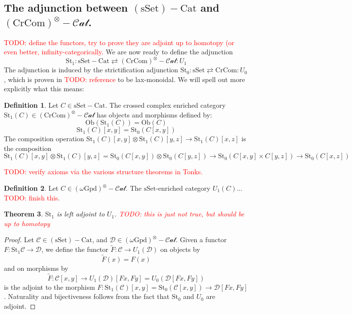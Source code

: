 \documentclass[12pt]{article}
\newtheorem{theorem}{Theorem}[section]
\theoremstyle{definition}
\newtheorem{definition}[theorem]{Definition}
\newcommand{\TODO}[1]{\textcolor{red}{TODO: {#1}}}
\newcommand{\C}{\mathcal{C}}
\newcommand{\D}{\mathcal{D}}
\newcommand{\sset}{\text{sSet}}
\newcommand{\stinfty}{\omega\text{Gpd}}
\newcommand{\crcom}{\text{CrCom}}
\newcommand{\graycatzero}{(\stinfty)^\otimes-\mathcal{Cat}}
\newcommand{\tensorcrossedcat}{(\crcom)^\otimes-\mathcal{Cat}}
\newcommand{\ssetcat}{(\text{sSet})-\text{Cat}}
\begin{document}
	\subsection{The adjunction between $\ssetcat$ and $\tensorcrossedcat$.}
		\TODO{define the functors, try to prove they are adjoint up to homotopy (or even better, infinity-categorically.}
		We are now ready to define the adjunction
		$$
			\text{St}_1: \sset-\text{Cat} \rightleftarrows \tensorcrossedcat: U_1
		$$
		The adjunction is induced by the strictification adjunction $\text{St}_0: \sset \rightleftarrows \crcom :  U_0$, which is proven in \TODO{reference} to be lax-monoidal. We will spell out more explicitly what this means:
		\begin{definition}
			Let $C \in \sset-\text{Cat}$. The crossed complex enriched category $\text{St}_1(C)\in \tensorcrossedcat$ has objects and morphisms defined by:
				$$\text{Ob}(\text{St}_1(C)) = \text{Ob}(C)$$
				$$\text{St}_1(C)[x,y] = \text{St}_0(C[x,y])$$
				The composition operation $\text{St}_1(C)[x,y] \otimes \text{St}_1(C)[y,z] \to \text{St}_1(C)[x,z]$ is the composition
				$$
					\text{St}_1(C)[x,y] \otimes \text{St}_1(C)[y,z] = \text{St}_0(C[x,y]) \otimes \text{St}_0(C[y,z]) \to \text{St}_0(C[x,y] \times C[y,z]) \to \text{St}_0(C[x,z]) 
				$$ 
		\end{definition}
			\TODO{verify axioms via the various structure theorems in Tonks.}
		\begin{definition}
			Let $C \in \graycatzero$. The $\sset$-enriched category $U_1(C)$... \TODO{finish this}.
		\end{definition}
			
		\begin{theorem}
			$\text{St}_1$ is left adjoint to $U_1$. \TODO{this is just not true, but should be up to homotopy}
		\end{theorem}
		\begin{proof}
			Let $\C \in (\sset)-\text{Cat}$, and $\D \in \graycatzero$. Given a functor $F: \text{St}_1 \C \to \D$, we define the functor $\tilde{F}: \C \to U_1(\D)$ on objects by
			$$
				\tilde{F}(x) = F(x)			
			$$
			and on morphisms by 
			$$
				\tilde{F}: \C[x,y] \to U_1(\D)[Fx,Fy] = U_0(\D[Fx,Fy])			
			$$
			is the adjoint to the morphism $F: \text{St}_1(\C)[x,y] = \text{St}_0(\C[x,y])  \to \D[Fx,Fy]$.
			Naturality and bijectiveness follows from the fact that $\text{St}_0$ and $U_0$ are adjoint.
		\end{proof}
		
\end{document}
